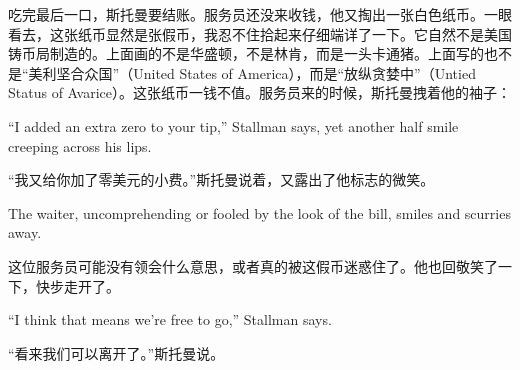 \ifdefined\chs
吃完最后一口，斯托曼要结账。服务员还没来收钱，他又掏出一张白色纸币。一眼看去，这张纸币显然是张假币，我忍不住拾起来仔细端详了一下。它自然不是美国铸币局制造的。上面画的不是华盛顿，不是林肯，而是一头卡通猪。上面写的也不是``美利坚合众国''（United States of America），而是``放纵贪婪中''（Untied Status of Avarice）。这张纸币一钱不值\ifdefined\vtwo {}。\fi 服务员来的时候，斯托曼拽着他的袖子：
\fi

\ifdefined\eng
``I added an extra zero to your tip,'' Stallman says, yet another half smile creeping across his lips.
\fi

\ifdefined\chs
``我又给你加了零美元的小费。''斯托曼说着，又露出了他标志的微笑。
\fi

\ifdefined\eng
The waiter, uncomprehending or fooled by the look of the bill, smiles and scurries away.
\fi

\ifdefined\chs
这位服务员可能没有领会什么意思，或者真的被这假币迷惑住了。他也回敬笑了一下，快步走开了。
\fi

\ifdefined\eng
``I think that means we're free to go,'' Stallman says.
\fi

\ifdefined\chs
``看来我们可以离开了。''斯托曼说。
\fi

\theendnotes
\setcounter{endnote}{0}
